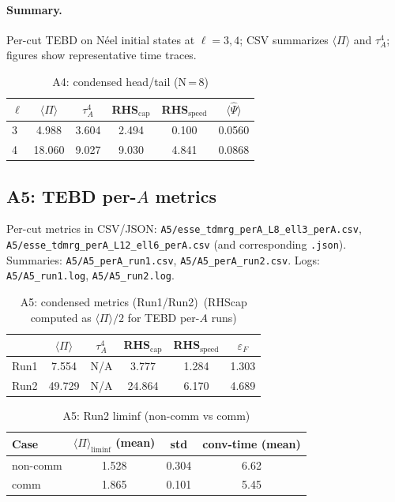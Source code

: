 \documentclass[10pt]{article}
\begin{document}
\paragraph{Summary.}
Per-cut TEBD on N\'eel initial states at \(\ell{=}3,4\); CSV summarizes $\langle\Pi\rangle$ and $\tau_A^4$; figures show representative time traces.

\begin{table}[!ht]
\centering
\caption{A4: condensed head/tail (N\,=\,8)}
\label{tab:a4-condensed}
\begin{tabular}{@{}lccccc@{}}
\toprule
$\ell$ & $\langle\Pi\rangle$ & $\tau_A^4$ & RHS$_{\mathrm{cap}}$ & RHS$_{\mathrm{speed}}$ & $\langle\widehat{\Psi}\rangle$ \\
\midrule
3 & 4.988 & 3.604 & 2.494 & 0.100 & 0.0560 \\
4 & 18.060 & 9.027 & 9.030 & 4.841 & 0.0868 \\
\bottomrule
\end{tabular}
\end{table}




\subsection{A5: TEBD per-\(A\) metrics}\label{app:a5}
Per-cut metrics in CSV/JSON: \texttt{A5/esse\_tdmrg\_perA\_L8\_ell3\_perA.csv}, \texttt{A5/esse\_tdmrg\_perA\_L12\_ell6\_perA.csv} (and corresponding \texttt{.json}). Summaries: \texttt{A5/A5\_perA\_run1.csv}, \texttt{A5/A5\_perA\_run2.csv}. Logs: \texttt{A5/A5\_run1.log}, \texttt{A5/A5\_run2.log}.

\begin{table}[!ht]
\centering
\caption{A5: condensed metrics (Run1/Run2)\footnotesize~(RHScap computed as $\langle\Pi\rangle/2$ for TEBD per-$A$ runs)}
\label{tab:a5-condensed}
\begin{tabular}{@{}lccccc@{}}
\toprule
 & $\langle\Pi\rangle$ & $\tau_A^4$ & RHS$_{\mathrm{cap}}$ & RHS$_{\mathrm{speed}}$ & $\varepsilon_F$ \\
\midrule
Run1 & 7.554 & N/A & 3.777 & 1.284 & 1.303 \\
Run2 & 49.729 & N/A & 24.864 & 6.170 & 4.689 \\
\bottomrule
\end{tabular}
\end{table}

\begin{table}[!ht]
\centering
\caption{A5: Run2 liminf (non-comm vs comm)}
\label{tab:a5-run2-liminf}
\begin{tabular}{@{}lccc@{}}
\toprule
Case & $\langle\Pi\rangle_{\mathrm{liminf}}$ (mean) & std & conv-time (mean) \\
\midrule
non-comm & 1.528 & 0.304 & 6.62 \\
comm     & 1.865 & 0.101 & 5.45 \\
\bottomrule
\end{tabular}
\end{table}
\end{document}
